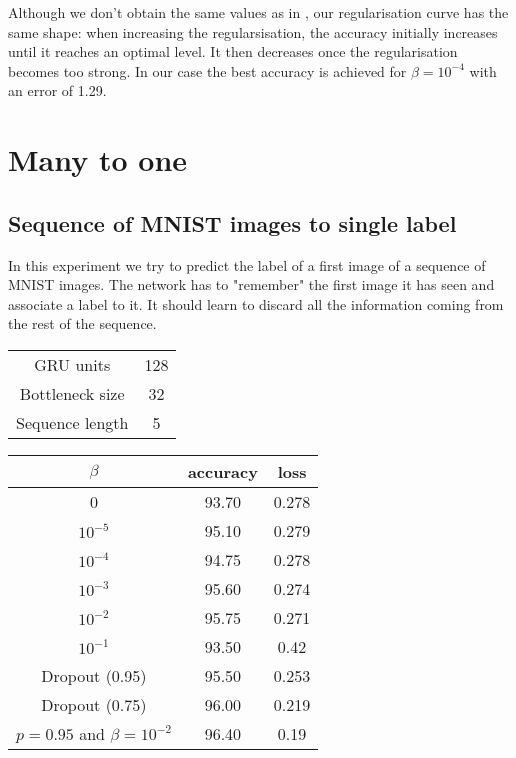 \documentclass[11pt,oneside,openright]{report}
\begin{document}
Although we don't obtain the same values as in \cite{vib}, our regularisation curve has the same shape: when increasing the regularsisation, the accuracy initially increases until it reaches an optimal level. It then decreases once the regularisation becomes too strong. In our case the best accuracy is achieved for $\beta = 10^{-4}$ with an error of 1.29.


\section{Many to one}
\subsection{Sequence of MNIST images to single label}
In this experiment we try to predict the label of a first image of a sequence of MNIST images. The network has to "remember" the first image it has seen and associate a label to it. It should learn to discard all the information coming from the rest of the sequence.

\begin{minipage}{0.5\textwidth}
        \centering
\begin{tabular}{ c | c  }
 GRU units & 128 \\
 Bottleneck size & 32 \\
 Sequence length & 5 \\
\end{tabular}
    \end{minipage}\hfill
    \begin{minipage}{0.5\textwidth}
        \centering
\begin{tabular}{ c | c c }
 $\beta$ & accuracy & loss \\
 \hline
0 & 93.70 & 0.278 \\
$10^{-5}$ & 95.10 & 0.279 \\
$10^{-4}$ & 94.75 & 0.278 \\
$10^{-3}$ & 95.60 & 0.274 \\
$10^{-2}$ & 95.75 & 0.271 \\
$10^{-1}$ & 93.50 & 0.42 \\
\hline
\hline
Dropout (0.95) & 95.50 & 0.253\\
Dropout (0.75) & 96.00 & 0.219\\
$p = 0.95$ and  $\beta = 10^{-2}$ &  96.40 & 0.19

\end{tabular}
    \end{minipage}
\end{document}
